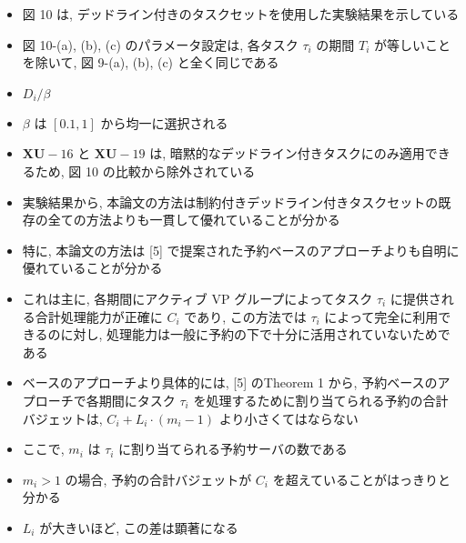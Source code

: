\begin{frame}{}
    \begin{itemize}
        \item 図 10 は, デッドライン付きのタスクセットを使用した実験結果を示している
\item 図 10-(a), (b), (c) のパラメータ設定は, 各タスク $\tau_{i}$ の期間 $T_{i}$ が等しいことを除いて, 図 9-(a), (b), (c) と全く同じである
\item $D_{i} / \beta$ 
\item $\beta$ は $[0.1,1]$ から均一に選択される
\item $\mathbf{X U}-16$ と $\mathbf{X U}-19$ は, 暗黙的なデッドライン付きタスクにのみ適用できるため, 図 10 の比較から除外されている
\item 実験結果から, 本論文の方法は制約付きデッドライン付きタスクセットの既存の全ての方法よりも一貫して優れていることが分かる
    \end{itemize}
\end{frame}

\begin{frame}{}
    \begin{itemize}
        \item 特に, 本論文の方法は [5] で提案された予約ベースのアプローチよりも自明に優れていることが分かる
\item これは主に, 各期間にアクティブ VP グループによってタスク $\tau_{i}$ に提供される合計処理能力が正確に $C_{i}$ であり, この方法では $\tau_{i}$ によって完全に利用できるのに対し, 処理能力は一般に予約の下で十分に活用されていないためである
\item ベースのアプローチより具体的には, [5] のTheorem 1 から, 予約ベースのアプローチで各期間にタスク $\tau_{i}$ を処理するために割り当てられる予約の合計バジェットは, $C_{i}+L_{i} \cdot\left(m_{i}-1\right)$ より小さくてはならない
\item ここで, $m_{i}$ は $\tau_{i}$ に割り当てられる予約サーバの数である
\item $m_{i}>1$ の場合, 予約の合計バジェットが $C_{i}$ を超えていることがはっきりと分かる
\item $L_{i}$ が大きいほど, この差は顕著になる
    \end{itemize}
\end{frame}
